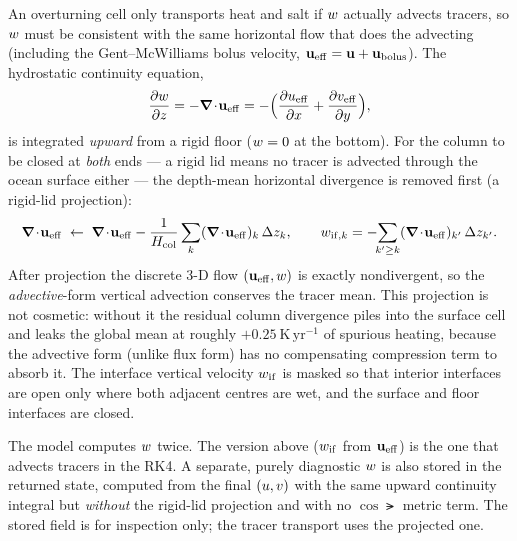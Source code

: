 An overturning cell only transports heat and salt if $w$ actually advects
tracers, so $w$ must be consistent with the same horizontal flow that does the
advecting (including the Gent--McWilliams bolus velocity, $\mathbf{u}_{\mathrm{eff}} =
\mathbf{u} + \mathbf{u}_{\mathrm{bolus}}$). The hydrostatic continuity equation,
\begin{equation}
  \frac{\partial w}{\partial z} = -\boldsymbol{\nabla}\!\cdot\!\mathbf{u}_{\mathrm{eff}} = -\Big(\frac{\partial u_{\mathrm{eff}}}{\partial x}+\frac{\partial v_{\mathrm{eff}}}{\partial y}\Big),
  \label{eq:continuity}
\end{equation}
is integrated \emph{upward} from a rigid floor ($w=0$ at the bottom). For the
column to be closed at \emph{both} ends --- a rigid lid means no tracer is advected
through the ocean surface either --- the depth-mean horizontal divergence is removed
first (a rigid-lid projection):
\begin{equation}
  \diver\uvec_{\mathrm{eff}} \;\leftarrow\; \diver\uvec_{\mathrm{eff}}
       - \frac{1}{\Hcol}\sum_k (\diver\uvec_{\mathrm{eff}})_k\,\Delta z_k ,
  \qquad
  \ww_{\mathrm{if},k} = -\!\!\sum_{k'\ge k}(\diver\uvec_{\mathrm{eff}})_{k'}\,\Delta z_{k'} .
  \label{eq:w-project}
\end{equation}
After projection the discrete 3-D flow $(\mathbf{u}_{\mathrm{eff}},w)$ is exactly
nondivergent, so the \emph{advective}-form vertical advection conserves the tracer
mean. This projection is not cosmetic: without it the residual column divergence
piles into the surface cell and leaks the global mean at roughly $+0.25\
\mathrm{K\,yr^{-1}}$ of spurious heating, because the advective form (unlike flux
form) has no compensating compression term to absorb it. The interface vertical
velocity $w_{\mathrm{if}}$ is masked so that interior interfaces are open only
where both adjacent centres are wet, and the surface and floor interfaces are closed.

\begin{remark}
The model computes $w$ twice. The version above ($w_{\mathrm{if}}$ from
$\mathbf{u}_{\mathrm{eff}}$) is the one that advects tracers in the RK4. A separate,
purely diagnostic $w$ is also stored in the returned state, computed from the
final $(u,v)$ with the same upward continuity integral but \emph{without} the
rigid-lid projection and with no $\cos\lat$ metric term. The stored field is for
inspection only; the tracer transport uses the projected one.
\end{remark}

